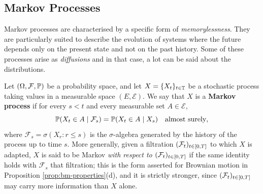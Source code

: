 

\subsection{Markov Processes}\label{subsec:markovprocesses}

Markov processes are characterised by a specific form of \emph{memorylessness}. They are particularly suited to describe the evolution of systems where the future depends only on the present state and not on the past history. Some of these processes arise as \textit{diffusions} and in that case, a lot can be said about the distributions.

\begin{definition}
Let \((\Omega, \mathcal{F}, \mathbb{P})\) be a probability space, and let \(X = \{X_t\}_{t \in \mathbb{T}}\) be a stochastic process taking values in a measurable space \((E, \mathcal{E})\). We say that \(X\) is a \textbf{Markov process} if for every $s < t$ and every measurable set $A \in \mathcal{E}$,
\begin{equation}
\mathbb{P}(X_t \in A \mid \mathcal{F}_s) = \mathbb{P}(X_t \in A \mid X_s) \quad \text{almost surely},
\end{equation}
where $\mathcal{F}_s = \sigma(X_r : r \leq s)$ is the $\sigma$-algebra generated by the history of the process up to time $s$. More generally, given a filtration $(\mathcal{F}_t)_{t\in[0,T]}$ to which $X$ is adapted, $X$ is said to be Markov \emph{with respect to $(\mathcal{F}_t)_{t\in[0,T]}$} if the same identity holds with $\mathcal{F}_s$ that filtration; this is the form asserted for Brownian motion in Proposition \ref{prop:bm-properties}(d), and it is strictly stronger, since $(\mathcal{F}_t)_{t\in[0,T]}$ may carry more information than $X$ alone.
\end{definition}

